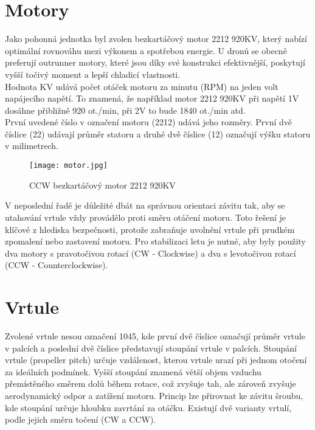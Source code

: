 \documentclass[12pt]{report}
\begin{document}
\section[Motory]{Motory}
Jako pohonná jednotka byl zvolen bezkartáčový motor 2212 920KV, který nabízí optimální rovnováhu mezi výkonem a spotřebou energie. U dronů se obecně preferují outrunner motory, které jsou díky své konstrukci efektivnější, poskytují vyšší točivý moment a lepší chladicí vlastnosti.\\
Hodnota KV udává počet otáček motoru za minutu (RPM) na jeden volt napájecího napětí. To znamená, že například motor 2212 920KV při napětí 1V dosáhne přibližně 920 ot./min, při 2V to bude 1840 ot./min atd.\\
První uvedené číslo v označení motoru (2212) udává jeho rozměry. První dvě číslice (22) udávají průměr statoru a druhé dvě číslice (12) označují výšku statoru v milimetrech.\\
\begin{figure}[H]
	\centering
	\texttt{[image: motor.jpg]}
	\caption{CCW bezkartáčový motor 2212 920KV}
	\label{fig:motor.jpg}
\end{figure}
V neposlední řadě je důležité dbát na správnou orientaci závitu tak, aby se utahování vrtule vždy provádělo proti směru otáčení motoru. Toto řešení je klíčové z hlediska bezpečnosti, protože zabraňuje uvolnění vrtule při prudkém zpomalení nebo zastavení motoru. Pro stabilizaci letu je nutné, aby byly použity dva motory s pravotočivou rotací (CW - Clockwise) a dva s levotočivou rotací (CCW - Counterclockwise). \cite{ol}\\

\section[Vrtule]{Vrtule}
Zvolené vrtule nesou označení 1045, kde první dvě číslice označují průměr vrtule v palcích a poslední dvě číslice představují stoupání vrtule v palcích. Stoupání vrtule (propeller pitch) určuje vzdálenost, kterou vrtule urazí při jednom otočení za ideálních podmínek. Vyšší stoupání znamená větší objem vzduchu přemístěného směrem dolů během rotace, což zvyšuje tah, ale zároveň zvyšuje aerodynamický odpor a zatížení motoru. Princip lze přirovnat ke závitu šroubu, kde stoupání určuje hloubku zavrtání za otáčku. Existují dvě varianty vrtulí, podle jejich směru točení (CW a CCW).\\
\end{document}
